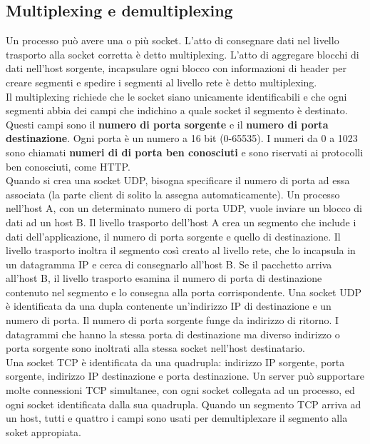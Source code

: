 \documentclass[11pt]{article}
\begin{document}
\subsection{Multiplexing e demultiplexing}
Un processo può avere una o più socket. L'atto di consegnare dati nel livello trasporto alla socket corretta è detto 
multiplexing. L'atto di aggregare blocchi di dati nell'host sorgente, incapsulare ogni blocco con informazioni di header
per creare segmenti e spedire i segmenti al livello rete è detto multiplexing.\\
Il multiplexing richiede che le socket siano unicamente identificabili e che ogni segmenti abbia dei campi che indichino
a quale socket il segmento è destinato. Questi campi sono il \textbf{numero di porta sorgente} e il \textbf{numero di 
porta destinazione}. Ogni porta è un numero a 16 bit (0-65535). I numeri da 0 a 1023 sono chiamati \textbf{numeri di
di porta ben conosciuti} e sono riservati ai protocolli ben conosciuti, come HTTP.\\
Quando si crea una socket UDP, bisogna specificare il numero di porta ad essa associata (la parte client di solito la
assegna automaticamente). Un processo nell'host A, con un determinato numero di porta UDP, vuole inviare un blocco di 
dati ad un host B. Il livello trasporto dell'host A crea un segmento che include i dati dell'applicazione, il numero di 
porta sorgente e quello di destinazione. Il livello trasporto inoltra il segmento così creato al livello rete, che lo 
incapsula in un datagramma IP e cerca di consegnarlo all'host B. Se il pacchetto arriva all'host B, il livello trasporto
esamina il numero di porta di destinazione contenuto nel segmento e lo consegna alla porta corrispondente. 
Una socket UDP è identificata da una dupla contenente un'indirizzo IP di destinazione e un numero di porta. Il numero di 
porta sorgente funge da indirizzo di ritorno. I datagrammi che hanno la stessa porta di destinazione ma diverso indirizzo
o porta sorgente sono inoltrati alla stessa socket nell'host destinatario.\\
Una socket TCP è identificata da una quadrupla: indirizzo IP sorgente, porta sorgente, indirizzo IP destinazione e porta
destinazione. Un server può supportare molte connessioni TCP simultanee, con ogni socket collegata ad un processo, ed 
ogni socket identificata dalla sua quadrupla. Quando un segmento TCP arriva ad un host, tutti e quattro i campi sono
usati per demultiplexare il segmento alla soket appropiata.
\end{document}

